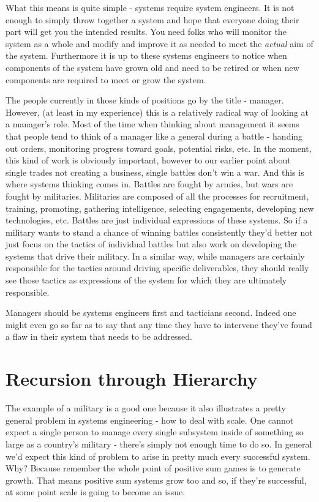 \documentclass[11pt,a5paper]{book}
\begin{document}
What this means is quite simple - systems require system engineers. It is not enough to simply throw together a system and hope that everyone doing their part will get you the intended results. You need folks who will monitor the system as a whole and modify and improve it as needed to meet the \textit{actual} aim of the system. Furthermore it is up to these systems engineers to notice when components of the system have grown old and need to be retired or when new components are required to meet or grow the system.
\newline

The people currently in those kinds of positions go by the title - manager. However, (at least in my experience) this is a relatively radical way of looking at a manager's role. Most of the time when thinking about management it seems that people tend to think of a manager like a general during a battle - handing out orders, monitoring progress toward goals, potential risks, etc. In the moment, this kind of work is obviously important, however to our earlier point about single trades not creating a business, single battles don't win a war. And this is where systems thinking comes in. Battles are fought by armies, but wars are fought by militaries. Militaries are composed of all the processes for recruitment, training, promoting, gathering intelligence, selecting engagements, developing new technologies, etc. Battles are just individual expressions of these systems. So if a military wants to stand a chance of winning battles consistently they'd better not just focus on the tactics of individual battles but also work on developing the systems that drive their military. In a similar way, while managers are certainly responsible for the tactics around driving specific deliverables, they should really see those tactics as expressions of the system for which they are ultimately responsible.
\newline

Managers should be systems engineers first and tacticians second. Indeed one might even go so far as to say that any time they have to intervene they've found a flaw in their system that needs to be addressed. 

\section{Recursion through Hierarchy}
The example of a military is a good one because it also illustrates a pretty general problem in systems engineering - how to deal with scale. One cannot expect a single person to manage every single subsystem inside of something so large as a country's military - there's simply not enough time to do so. In general we'd expect this kind of problem to arise in pretty much every successful system. Why? Because remember the whole point of positive sum games is to generate growth. That means positive sum systems grow too and so, if they're successful, at some point scale is going to become an issue. 
\newline
\end{document}
